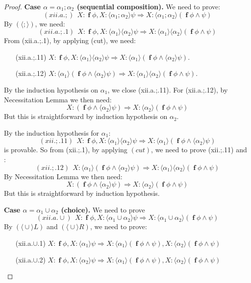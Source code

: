 \documentclass[manuscript,screen]{acmart}
\newcommand{\la}[0]{\langle}
\newcommand{\ra}[0]{\rangle}
\DeclareMathOperator{\seq}{;}
\DeclareMathOperator{\cho}{\cup}
\DeclareMathOperator{\ofst}{\mathbf{f}}
\begin{document}
\begin{proof}
\textbf{Case $\alpha = \alpha_1\seq\alpha_2$ (sequential composition).} 
We need to prove:
$$
(xii.a.;)\ \ X : \ofst\phi, X : \la\alpha_1\seq \alpha_2\ra\psi\Rightarrow X : \la\alpha_1\seq \alpha_2\ra(\ofst\phi\wedge\psi)
$$
By $(\la\seq\ra)$, we need:
$$
(xii.a.;.1)\ \ X : \ofst\phi, X : \la\alpha_1\ra\la\alpha_2\ra\psi\Rightarrow X : \la\alpha_1\ra\la\alpha_2\ra(\ofst\phi\wedge\psi)
$$
From (xii.a.;.1), by applying (cut), we need:
\begin{enumerate}
\item[(xii.a.;.11)] $X : \ofst\phi, X : \la\alpha_1\ra\la\alpha_2\ra\psi\Rightarrow X : \la\alpha_1\ra(\ofst\phi\wedge\la\alpha_2\ra\psi)$.
\item[(xii.a.;.12)]  $X : \la\alpha_1\ra(\ofst\phi\wedge\la\alpha_2\ra\psi)\Rightarrow X : \la\alpha_1\ra\la\alpha_2\ra(\ofst\phi\wedge\psi)$.
\end{enumerate}
By the induction hypothesis on $\alpha_1$, we close (xii.a.;.11). 
For (xii.a.;.12), by Necessitation Lemma we then need:
$$
X : (\ofst\phi\wedge\la\alpha_2\ra\psi)\Rightarrow X : \la\alpha_2\ra(\ofst \phi\wedge \psi)
$$
But this is straightforward by induction hypothesis on $\alpha_2$.

\ifx 
By the induction hypothesis for $\alpha_1$:
$$
(xii.;.11)\ \ X : \ofst\phi, X : \la\alpha_1\ra\la\alpha_2\ra\psi\Rightarrow X : \la\alpha_1\ra(\ofst\phi\wedge\la\alpha_2\ra\psi)
$$
is provable. 
So from (xii.;.1), by applying $(\textit{cut})$, we need to prove (xii.;.11) and :
$$
(xii.;.12)\ \ X : \la\alpha_1\ra(\ofst\phi\wedge\la\alpha_2\ra\psi)\Rightarrow X : \la\alpha_1\ra\la\alpha_2\ra(\ofst \phi\wedge \psi)
$$
By Necessitation Lemma we then need: 
$$
X : (\ofst\phi\wedge\la\alpha_2\ra\psi)\Rightarrow X : \la\alpha_2\ra(\ofst \phi\wedge \psi)
$$
But this is straightforward by induction hypothesis. 
\fi

\textbf{Case $\alpha = \alpha_1\cho\alpha_2$ (choice).} 
 We need to prove 
$$
(xii.a.\cup)\ \ X : \ofst\phi, X : \la\alpha_1\cho \alpha_2\ra\psi\Rightarrow X : \la\alpha_1\cho \alpha_2\ra(\ofst\phi\wedge\psi)
$$
By $(\la\cho\ra L)$ and $(\la\cho\ra R)$, we need to prove: 
\begin{enumerate}
\item[(xii.a.$\cup$.1)] $X : \ofst \phi, X : \la\alpha_1\ra\psi \Rightarrow X : \la\alpha_1\ra(\ofst\phi\wedge\psi), X : \la\alpha_2\ra(\ofst\phi\wedge\psi)$
\item[(xii.a.$\cup$.2)] $X : \ofst \phi, X : \la\alpha_2\ra\psi \Rightarrow X : \la\alpha_1\ra(\ofst\phi\wedge\psi), X : \la\alpha_2\ra(\ofst\phi\wedge\psi)$
\end{enumerate}


\end{proof}
\end{document}
